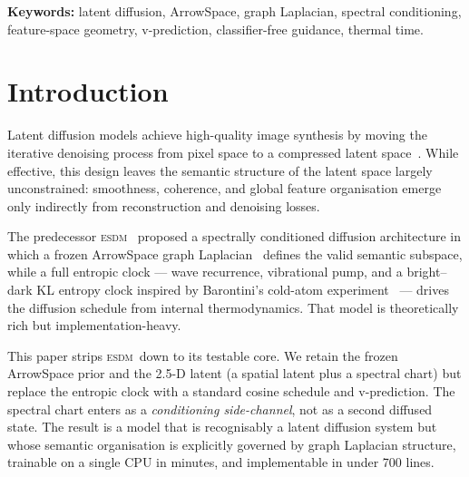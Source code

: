 \documentclass[11pt]{article}
\newcommand{\ESDM}{\textsc{esdm}}
\begin{document}
    \vspace{1em} \noindent \textbf{Keywords:} latent diffusion, ArrowSpace, graph Laplacian, spectral conditioning, feature-space geometry, v-prediction, classifier-free guidance, thermal time.  \newpage \tableofcontents \newpage

    \section{Introduction} \label{sec:introduction}
    Latent diffusion models achieve high-quality image synthesis by
    moving the iterative denoising process from pixel space to a
    compressed latent space~\cite{Rombach2022}. While effective, this
    design leaves the semantic structure of the latent space largely
    unconstrained: smoothness, coherence, and global feature
    organisation emerge only indirectly from reconstruction and
    denoising losses.

    The predecessor \ESDM~\cite{Moriondo2026ESDM_code} proposed a
    spectrally conditioned diffusion architecture in which a frozen
    ArrowSpace graph Laplacian~\cite{Moriondo2025JOSS,
    MoriondoAzizi2026} defines the valid semantic subspace, while a
    full entropic clock --- wave recurrence, vibrational pump, and a
    bright--dark KL entropy clock inspired by Barontini's cold-atom
    experiment~\cite{Barontini2026} --- drives the diffusion schedule
    from internal thermodynamics. That model is theoretically rich
    but implementation-heavy.

    This paper strips \ESDM~down to its testable core. We retain the
    frozen ArrowSpace prior and the 2.5-D latent (a spatial latent
    plus a spectral chart) but replace the entropic clock with a
    standard cosine schedule and v-prediction. The spectral chart
    enters as a \emph{conditioning side-channel}, not as a second
    diffused state. The result is a model that is recognisably a
    latent diffusion system but whose semantic organisation is
    explicitly governed by graph Laplacian structure, trainable on a
    single CPU in minutes, and implementable in under 700 lines.
    
\end{document}
